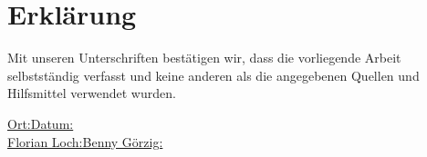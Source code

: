 \documentclass[a4,12pt,ngerman,listof=numbered]{scrartcl}
\newcommand*{\qqquad}{\qquad\qquad\qquad\qquad}
\begin{document}


\newif\ifsigned
\signedtrue

\ifsigned
	\newpage
	\section*{Erklärung}
	Mit unseren Unterschriften bestätigen wir, dass die vorliegende Arbeit selbstständig verfasst und keine anderen als die angegebenen Quellen und Hilfsmittel verwendet wurden.\\
	
	\begin{flushleft}
		\uline{Ort:\qqquad\qqquad}\quad\uline{Datum:\qqquad\qqquad}\\
		\vspace{1cm}
		\uline{Florian Loch:\qqquad\qquad\qquad}\quad\uline{Benny Görzig:\qqquad\qquad\quad}
	\end{flushleft}
	\vfill
	\newpage
\fi

\normalem %

\tableofcontents

\newpage



\newpage



\newpage



\newpage



\newpage



\newpage

\appendix	


\end{document}
